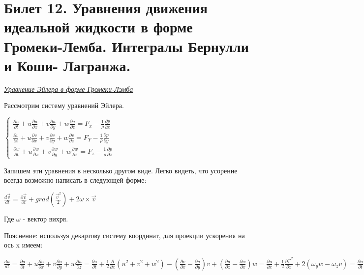 \newpage
\section{Билет 12. Уравнения движения идеальной жидкости в форме Громеки-Лемба. Интегралы Бернулли и Коши- Лагранжа.}

\begin{center}
  \textit{\underline{Уравнение Эйлера в форме Громеки-Лэмба}}
\end{center}
Рассмотрим систему уравнений Эйлера.
\begin{center}
  $\begin{cases}
      \frac{\partial u}{\partial t} + u\frac{\partial u}{\partial x} + v\frac{\partial u}{\partial y} + w\frac{\partial u}{\partial z} = F_x - \frac{1}{\rho}\frac{\partial p}{\partial x} \\
      \frac{\partial v}{\partial t} + u\frac{\partial v}{\partial x} + v\frac{\partial v}{\partial y} + w\frac{\partial v}{\partial z} = F_Y - \frac{1}{\rho}\frac{\partial p}{\partial y} \\
      \frac{\partial w}{\partial t} + u\frac{\partial w}{\partial x} + v\frac{\partial w}{\partial y} + w\frac{\partial w}{\partial z} = F_z - \frac{1}{\rho}\frac{\partial p}{\partial z}
    \end{cases}$
\end{center}
Запишем эти уравнения в несколько другом виде. Легко видеть, что усорение всегда возможно написать в следующей форме:
\begin{center}
  $\frac{d \vec{v}}{dt} = \frac{\partial \vec{v}}{\partial t} + grad(\frac{\vec{v}^2}{2}) + 2 \omega \times \vec{v}$
\end{center}
Где $\omega$ - вектор вихря.

Пояснение: используя декартову систему координат, для проекции ускорения на ось x имеем:
\begin{center}
  $\frac{du}{dt} = \frac{\partial u}{\partial t} + u \frac{\partial u}{\partial x} + v \frac{\partial u}{\partial y} + w \frac{\partial u}{\partial z} = \frac{\partial u}{\partial t} + \frac{1}{2}\frac{\partial}{\partial x}\left(u^2 + v^2 + w^2\right) - (\frac{\partial v}{\partial x} - \frac{\partial u}{\partial y}) v + (\frac{\partial u}{\partial z} - \frac{\partial w}{\partial x})w = \frac{\partial u}{\partial x} + \frac{1}{2}\frac{\partial \vec{v}^2}{\partial x} + 2(\omega_yw - \omega_zv) = \frac{\partial u}{\partial t} + \frac{1}{2}\frac{\partial \vec{v}^2}{\partial x} + 2(\omega \times v)_x$
\end{center}

